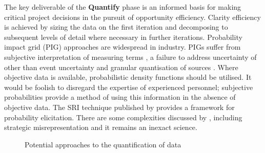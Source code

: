 The key deliverable of the \textbf{Quantify} phase is an informed basis for making critical project decisions in the pursuit of opportunity efficiency.
Clarity efficiency is achieved by sizing the data on the first iteration and decomposing to subsequent levels of detail where necessary in further iterations.
Probability impact grid (PIG) approaches are widespread in industry.
PIGs suffer from subjective interpretation of measuring terms \citep{Merkhofer}, a failure to address uncertainty of other than event uncertainty and granular quantisation of sources \citep{Cox2008}.
Where objective data is available, probabilistic density functions should be utilised.
It would be foolish to disregard the expertise of experienced personnel; subjective probabilities provide a method of using this information in the absence of objective data.
The SRI technique published by \citet{spetzer} provides a framework for probability elicitation.
There are some complexities discussed by \citet{Merkhofer}, including strategic misrepresentation \citep{flyvbjerg} and it remains an inexact science.


\begin{figure}[!h]
  \centering
{} \quad
{}
\caption{Potential approaches to the quantification of data}
\label{Figure:PIGPDF}
\end{figure}


